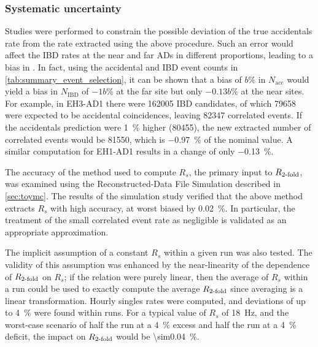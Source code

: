 \subsubsection{Systematic uncertainty}

Studies were performed to constrain the possible deviation
of the true accidentals rate
from the rate extracted using the above procedure.
Such an error would affect the IBD rates at the near and far ADs in different proportions,
leading to a bias in \thetaot{}.
In fact, using the accidental and IBD event counts in \cref{tab:summary_event_selection},
it can be shown that a bias of $b\si{\percent}$ in $N_{\text{acc}}$
would yield a bias in $N_{\text{IBD}}$ of $-1b\si{\percent}$ at the far site
but only $-0.13b\si{\percent}$ at the near sites.
For example, in EH3-AD1 there were \num{162005} IBD candidates,
of which \num{79658} were expected to be accidental coincidences,
leaving \num{82347} correlated events.
If the accidentals prediction were \SI{1}{\percent} higher (\num{80455}),
the new extracted number of correlated events would be \num{81550},
which is \SI{-0.97}{\percent} of the nominal value.
A similar computation for EH1-AD1 results in a change of only \SI{-0.13}{\percent}.

The accuracy of the method used to compute $R_{s}$,
the primary input to $R_{\text{\ensuremath{2}-fold}}$,
was examined using the Reconstructed-Data File Simulation described in \cref{sec:toymc}.
The results of the simulation study verified that
the above method extracts $R_s$ with high accuracy, at worst biased by \SI{0.02}{\percent}.
In particular, the treatment of the small correlated event rate as negligible
is validated as an appropriate approximation.

The implicit assumption of a constant $R_s$ within a given run was also tested.
The validity of this assumption was enhanced by the near-linearity of
the dependence of $R_{\text{\ensuremath{2}-fold}}$ on $R_s$;
if the relation were purely linear,
then the average of $R_s$ within a run could be used to exactly compute
the average $R_{\text{\ensuremath{2}-fold}}$ since averaging is a linear transformation.
Hourly singles rates were computed, and deviations of up to \SI{4}{\percent}
were found within runs.
For a typical value of $R_s$ of \SI{18}{\Hz},
and the worst-case scenario of half the run at a \SI{4}{\percent} excess
and half the run at a \SI{4}{\percent} deficit,
the impact on $R_{\text{\ensuremath{2}-fold}}$ would be \SI{\sim0.04}{\percent}.


